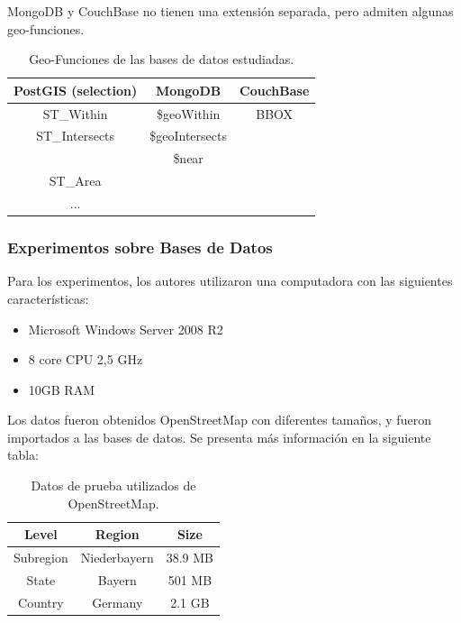 \documentclass[pdflatex,sn-mathphys-num]{sn-jnl}
\theoremstyle{thmstyleone}%
\theoremstyle{thmstyletwo}%
\theoremstyle{thmstylethree}%
\begin{document}
MongoDB y CouchBase no tienen una extensión separada, pero admiten algunas geo-funciones.

\vspace{-0.4cm}

\begin{table}[h!]
    \centering
    \begin{tabular}{ |c|c|c| }
    \hline
    PostGIS (selection)  & MongoDB & CouchBase \\ 
    \hline
    ST\_Within & \$geoWithin & BBOX \\
    ST\_Intersects & \$geoIntersects & \\ 
    & \$near &  \\
    ST\_Area & & \\
    ...& & \\
    \hline
    \end{tabular}
    \caption{Geo-Funciones de las bases de datos estudiadas.}
\end{table}

\vspace{-1cm}

\subsubsection{Experimentos sobre Bases de Datos}\label{sec522}

Para los experimentos, los autores utilizaron una computadora con las siguientes características:

\begin{itemize}
    \item Microsoft Windows Server 2008 R2
    \item 8 core CPU 2,5 GHz
    \item 10GB RAM
\end{itemize}

Los datos fueron obtenidos OpenStreetMap con diferentes tamaños, y fueron importados a las bases de datos. Se presenta más información en la siguiente tabla:

\begin{table}[h]
    \centering
    \begin{tabular}{ |c|c|c| }
    \hline
    Level & Region & Size \\ 
    \hline
    Subregion & Niederbayern & 38.9 MB \\
    State & Bayern & 501 MB \\ 
    Country & Germany & 2.1 GB \\
    \hline
    \end{tabular}
    \caption{Datos de prueba utilizados de OpenStreetMap.}
\end{table}
\end{document}
